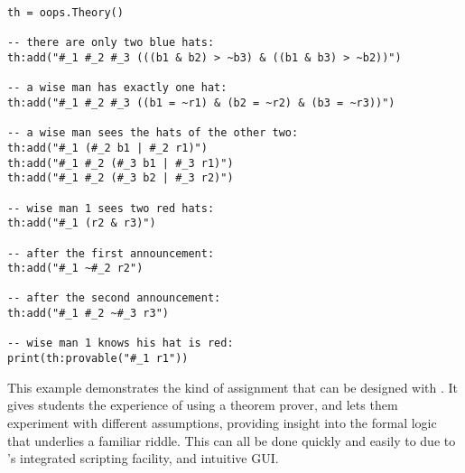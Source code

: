 \begin{lstlisting}
th = oops.Theory()

-- there are only two blue hats:
th:add("#_1 #_2 #_3 (((b1 & b2) > ~b3) & ((b1 & b3) > ~b2))")

-- a wise man has exactly one hat:
th:add("#_1 #_2 #_3 ((b1 = ~r1) & (b2 = ~r2) & (b3 = ~r3))")

-- a wise man sees the hats of the other two:
th:add("#_1 (#_2 b1 | #_2 r1)")
th:add("#_1 #_2 (#_3 b1 | #_3 r1)")
th:add("#_1 #_2 (#_3 b2 | #_3 r2)")

-- wise man 1 sees two red hats:
th:add("#_1 (r2 & r3)")

-- after the first announcement:
th:add("#_1 ~#_2 r2")

-- after the second announcement:
th:add("#_1 #_2 ~#_3 r3")

-- wise man 1 knows his hat is red:
print(th:provable("#_1 r1"))

\end{lstlisting}

This example demonstrates the kind of assignment that can be designed with  \oops\/. It gives students the experience of using a theorem prover, and lets them experiment with different assumptions, providing insight into the formal logic that underlies a familiar riddle. This can all be done quickly and easily to due to \oops's integrated scripting facility, and intuitive GUI.